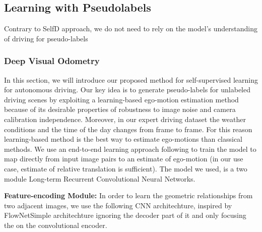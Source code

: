 \documentclass[letterpaper, 12pt]{article}
\theoremstyle{definition}
\theoremstyle{definition}
\theoremstyle{definition}
\theoremstyle{definition}
\theoremstyle{definition}
\begin{document}
\subsection{Learning with Pseudolabels}
\label{sec:orge62b1c5}
Contrary to SelfD approach, we do not need to rely on the model's understanding
of driving for pseudo-labels
\subsubsection{Deep Visual Odometry}
\label{sec:orgffa448f}
In this section, we will introduce our proposed method for self-supervised
learning for autonomous driving. Our key idea is to generate pseudo-labels for
unlabeled driving scenes by exploiting a learning-based ego-motion estimation
method because of its desirable properties of robustness to image noise and
camera calibration independence. Moreover, in our expert driving dataset the
weather conditions and the time of the day changes from frame to frame. For this
reason learning-based method is the best way to estimate ego-motions than
classical methods. We use an end-to-end learning approach following
\cite{Wang2017, Zhai2019} to train the model to map directly from input image
pairs to an estimate of ego-motion (in our use case, estimate of relative
translation is sufficient). The model we used, is a two module Long-term
Recurrent Convolutional Neural Networks.

\textbf{Feature-encoding Module:} In order to learn the geometric relationships from
two adjacent images, we use the following CNN architechture, inspired by
FlowNetSimple architechture \cite{Fischer2015} ignoring the decoder part of it
and only focusing the on the convolutional encoder.


\end{document}
